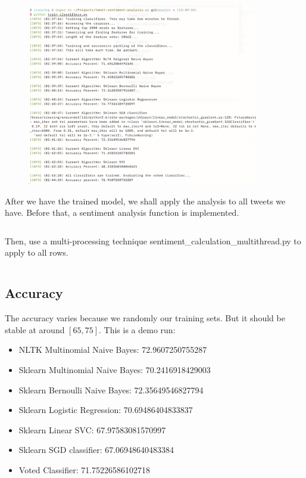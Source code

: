 \documentclass[12pt,a4paper]{article}
\begin{document}
    \begin{figure}[H]
      \includegraphics[width=0.9\textwidth]{train_output.png}
      \centering
    \end{figure}

    After we have the trained model, we shall apply the analysis to all tweets we have. Before that, a sentiment analysis function is implemented.

    \inputminted[mathescape, linenos, numbersep=5pt, frame=lines, framesep=2mm, breaklines]{python}{../sentiment.py}

    Then, use a multi-processing technique sentiment_calculation_multithread.py to apply to all rows.

    \inputminted[mathescape, linenos, numbersep=5pt, frame=lines, framesep=2mm, breaklines]{python}{../sentiment_calculation_multithread.py}

  \subsection{Accuracy}
    The accuracy varies because we randomly our training sets. But it should be stable at around $[65, 75]$. This is a demo run:

    \begin{itemize}
      \item NLTK Multinomial Naive Bayes: 72.9607250755287
      \item Sklearn Multinomial Naive Bayes: 70.2416918429003
      \item Sklearn Bernoulli Naive Bayes: 72.35649546827794
      \item Sklearn Logistic Regression: 70.69486404833837
      \item Sklearn Linear SVC: 67.97583081570997
      \item Sklearn SGD classifier: 67.06948640483384
      \item Voted Classifier: 71.75226586102718
    \end{itemize}
\end{document}
